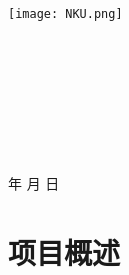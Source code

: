 \documentclass[a4paper]{article}
\newcommand{\HRule}{\rule{\linewidth}{0.5mm}}%
\begin{document}
\renewcommand{\contentsname}{目\ 录}
\renewcommand{\appendixname}{附录}
\renewcommand{\appendixpagename}{附录}
\renewcommand{\refname}{参考文献} 
\renewcommand{\figurename}{图}
\renewcommand{\tablename}{表}
\renewcommand{\today}{\number\year 年 \number\month 月 \number\day 日}

\begin{titlepage}
    \begin{center}
    \texttt{[image: NKU.png]}\\[1cm]
    \vspace{20mm}
		\textbf{\huge\textbf{}}\\[0.5cm]
		\textbf{\huge{}}\\[0.5cm]
		\textbf{\LARGE{}}\\[2.3cm]
		\textbf{\Huge\textbf{}}\\[0.5cm]
            \textbf{\LARGE\textbf{}}

		\vspace{\fill}
    
    \centering
    \textsc{\LARGE {}}\\[0.5cm]
    \textsc{\LARGE {}}\\[0.5cm]
    \textsc{\LARGE {}}\\[0.5cm]
    
    \vfill
    {\Large \today}
    \end{center}
\end{titlepage}

\renewcommand {\thefigure}{\thesection{}.\arabic{figure}}%
\renewcommand{\figurename}{图}
\renewcommand{\contentsname}{目录}  


\clearpage
\tableofcontents
\newpage


\section{项目概述}
\end{document}
